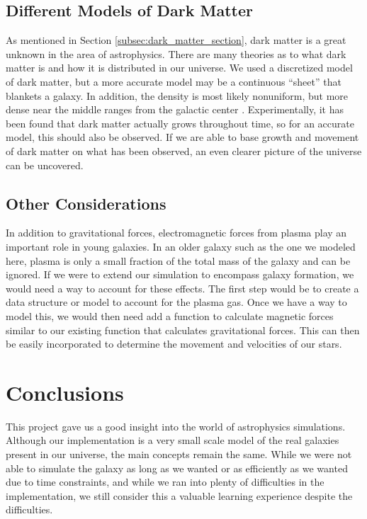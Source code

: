 \documentclass{article}
\begin{document}
\subsection{Different Models of Dark Matter}

As mentioned in Section \ref{subsec:dark_matter_section}, dark matter is a great unknown in the area of astrophysics.  There are many theories as to what dark matter is and how it is distributed in our universe.  We used a discretized model of dark matter, but a more accurate model may be a continuous ``sheet'' that blankets a galaxy.  In addition, the density is most likely nonuniform, but more dense near the middle ranges from the galactic center \cite{dark-halo}.  Experimentally, it has been found that dark matter actually grows throughout time, so for an accurate model, this should also be observed.  If we are able to base growth and movement of dark matter on what has been observed, an even clearer picture of the universe can be uncovered.

\subsection{Other Considerations}

In addition to gravitational forces, electromagnetic forces from plasma play an important role in young galaxies.  In an older galaxy such as the one we modeled here, plasma is only a small fraction of the total mass of the galaxy and can be ignored.  If we were to extend our simulation to encompass galaxy formation, we would need a way to account for these effects.  The first step would be to create a data structure or model to account for the plasma gas.  Once we have a way to model this, we would then need add a function to calculate magnetic forces similar to our existing function that calculates gravitational forces.  This can then be easily incorporated to determine the movement and velocities of our stars.

\section{Conclusions}

This project gave us a good insight into the world of astrophysics simulations.  Although our implementation is a very small scale model of the real galaxies present in our universe, the main concepts remain the same.  While we were not able to simulate the galaxy as long as we wanted or as efficiently as we wanted due to time constraints, and while we ran into plenty of difficulties in the implementation, we still consider this a valuable learning experience despite the difficulties.
\end{document}
